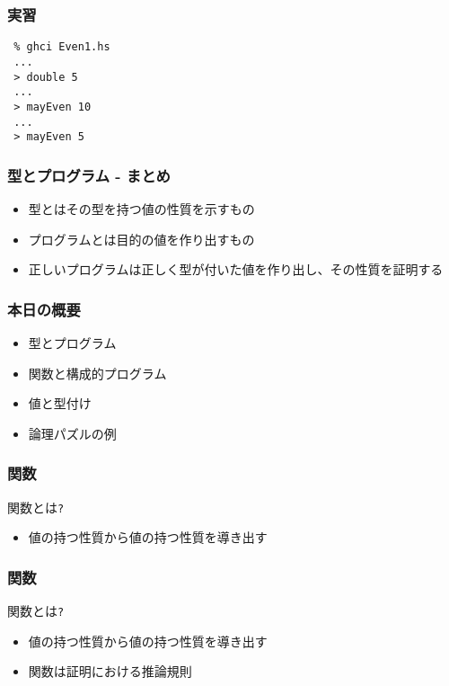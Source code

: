 \documentclass[cjk,dvipdfm,14pt]{beamer}
\begin{document}
\begin{frame}[fragile]
\frametitle{実習}

\begin{lstlisting}
 % ghci Even1.hs
 ...
 > double 5
 ...
 > mayEven 10
 ...
 > mayEven 5
\end{lstlisting}

\end{frame}

\begin{frame}[fragile]
\frametitle{型とプログラム - まとめ}

\begin{itemize}
\item 型とはその型を持つ値の性質を示すもの
\item プログラムとは目的の値を作り出すもの
\item 正しいプログラムは正しく型が付いた値を作り出し、その性質を証明する
\end{itemize}

\end{frame}

\begin{frame}[fragile]
\frametitle{本日の概要}

\begin{itemize}
\item 型とプログラム
\item { \color{red} 関数と構成的プログラム }
\item 値と型付け
\item 論理パズルの例
\end{itemize}

\end{frame}

\begin{frame}[fragile]
\frametitle{関数}

関数とは\verb|?|
\begin{itemize}
\item { \color{red} 値の持つ性質から値の持つ性質を導き出す}
\end{itemize}

\end{frame}

\begin{frame}[fragile]
\frametitle{関数}

関数とは\verb|?|
\begin{itemize}
\item 値の持つ性質から値の持つ性質を導き出す
\item { \color{red} 関数は証明における推論規則 }
\end{itemize}

\end{frame}
\end{document}
